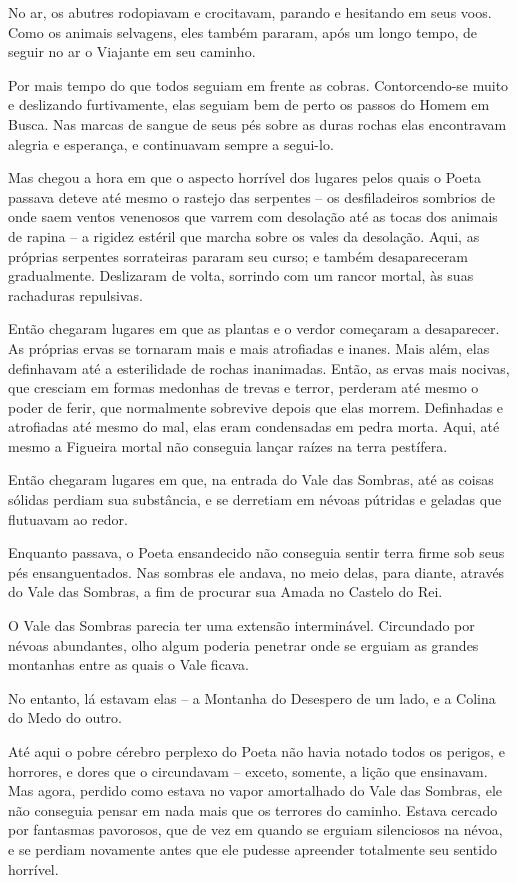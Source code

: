No ar, os abutres rodopiavam e crocitavam, parando e hesitando em seus
voos. Como os animais selvagens, eles também pararam, após um longo
tempo, de seguir no ar o Viajante em seu caminho.

Por mais tempo do que todos seguiam em frente as cobras. Contorcendo-se
muito e deslizando furtivamente, elas seguiam bem de perto os passos do
Homem em Busca. Nas marcas de sangue de seus pés sobre as duras rochas
elas encontravam alegria e esperança, e continuavam sempre a segui-lo.

Mas chegou a hora em que o aspecto horrível dos lugares pelos quais o
Poeta passava deteve até mesmo o rastejo das serpentes -- os
desfiladeiros sombrios de onde saem ventos venenosos que varrem com
desolação até as tocas dos animais de rapina -- a rigidez estéril que
marcha sobre os vales da desolação. Aqui, as próprias serpentes
sorrateiras pararam seu curso; e também desapareceram gradualmente.
Deslizaram de volta, sorrindo com um rancor mortal, às suas rachaduras
repulsivas.

Então chegaram lugares em que as plantas e o verdor começaram a
desaparecer. As próprias ervas se tornaram mais e mais atrofiadas e
inanes. Mais além, elas definhavam até a esterilidade de rochas
inanimadas. Então, as ervas mais nocivas, que cresciam em formas
medonhas de trevas e terror, perderam até mesmo o poder de ferir, que
normalmente sobrevive depois que elas morrem. Definhadas e atrofiadas
até mesmo do mal, elas eram condensadas em pedra morta. Aqui, até mesmo
a Figueira mortal não conseguia lançar raízes na terra pestífera.

Então chegaram lugares em que, na entrada do Vale das Sombras, até as
coisas sólidas perdiam sua substância, e se derretiam em névoas pútridas
e geladas que flutuavam ao redor.

Enquanto passava, o Poeta ensandecido não conseguia sentir terra firme
sob seus pés ensanguentados. Nas sombras ele andava, no meio delas,
para diante, através do Vale das Sombras, a fim de procurar sua Amada no
Castelo do Rei.

O Vale das Sombras parecia ter uma extensão interminável. Circundado por
névoas abundantes, olho algum poderia penetrar onde se erguiam as
grandes montanhas entre as quais o Vale ficava.

No entanto, lá estavam elas -- a Montanha do Desespero de um lado, e a
Colina do Medo do outro.

Até aqui o pobre cérebro perplexo do Poeta não havia notado todos os
perigos, e horrores, e dores que o circundavam -- exceto, somente, a
lição que ensinavam. Mas agora, perdido como estava no vapor amortalhado
do Vale das Sombras, ele não conseguia pensar em nada mais que os
terrores do caminho. Estava cercado por fantasmas pavorosos, que de vez
em quando se erguiam silenciosos na névoa, e se perdiam novamente antes
que ele pudesse apreender totalmente seu sentido horrível.

